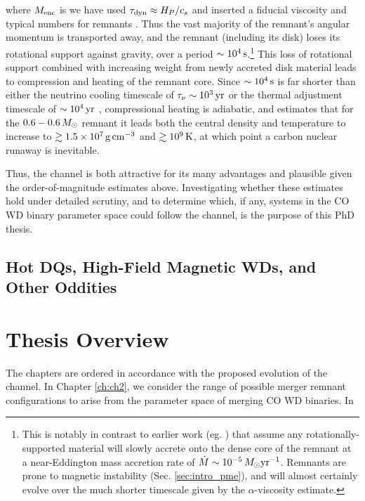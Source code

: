 \noindent where $M_\mathrm{enc}$ is we have used $\taudyn \approx H_P/c_s$ and inserted a fiducial viscosity and typical numbers for remnants \citep{shen+12}.  Thus the vast majority of the remnant's angular momentum is transported away, and the remnant (including its disk) loses its rotational support against gravity, over a period $\sim10^4\,\mathrm{s}$.\footnote{This is notably in contrast to earlier work (eg. \citep{nomoi85, yoonpr07}) that assume any rotationally-supported material will slowly accrete onto the dense core of the remnant at a near-Eddington mass accretion rate of $\dot{M} \sim 10^{-5}\,\Msun\pyr$.  Remnants are prone to magnetic instability (Sec. \ref{sec:intro_pme}), and will almost certainly evolve over the much shorter timescale given by the $\alpha$-viscosity estimate.}  This loss of rotational support combined with increasing weight from newly accreted disk material leads to compression and heating of the remnant core.  Since $\sim10^4\,\mathrm{s}$ is far shorter than either the neutrino cooling timescale of $\taunu \sim 10^3\,\mrm{yr}$ or the thermal adjustment timescale of $\sim10^4\,\mathrm{yr}$ \citep{shen+12}, compressional heating is adiabatic, and \citeal{vkercj10} estimates that for the $0.6-0.6\,\Msun$ remnant it leads both the central density and temperature to increase to $\gtrsim1.5\times10^7\,\gcc$ and $\gtrsim10^9\,\mathrm{K}$, at which point a carbon nuclear runaway is inevitable.

Thus, the \citeal{vkercj10} channel is both attractive for its many advantages and plausible given the order-of-magnitude estimates above.  Investigating whether these estimates hold under detailed scrutiny, and to determine which, if any, systems in the CO WD binary parameter space could follow the channel, is the purpose of this PhD thesis.

\subsection{Hot DQs, High-Field Magnetic WDs, and Other Oddities}



\section{Thesis Overview}

The chapters are ordered in accordance with the proposed evolution of the \citeal{vkercj10} channel.  In Chapter \ref{ch:ch2}, we consider the range of possible merger remnant configurations to arise from the parameter space of merging CO WD binaries.  In 

